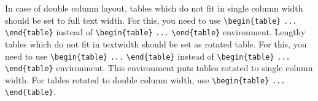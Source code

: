 In case of double column layout, tables which do not fit in single column width
should be set to full text width. For this, you need to use
\verb+\begin{table}+ \verb+...+ \verb+\end{table}+ instead of
\verb+\begin{table}+ \verb+...+ \verb+\end{table}+ environment. Lengthy tables
which do not fit in textwidth should be set as rotated table. For this, you need
to use \verb+\begin{table}+ \verb+...+ \verb+\end{table}+
instead of \verb+\begin{table}+ \verb+...+ \verb+\end{table}+ environment.
This environment puts tables rotated to single column width. For tables rotated
to double column width, use \verb+\begin{table}+ \verb+...+
\verb+\end{table}+.
